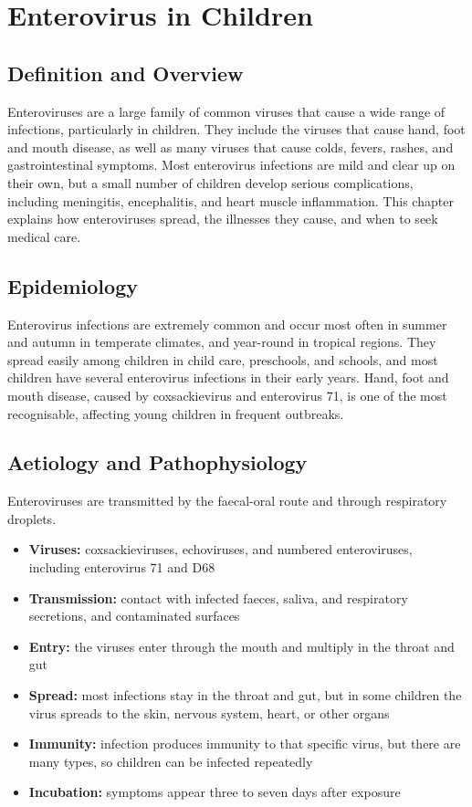 \chapter{Enterovirus in Children}

\section*{Definition and Overview}
Enteroviruses are a large family of common viruses that cause a wide range of infections, particularly in children. They include the viruses that cause hand, foot and mouth disease, as well as many viruses that cause colds, fevers, rashes, and gastrointestinal symptoms. Most enterovirus infections are mild and clear up on their own, but a small number of children develop serious complications, including meningitis, encephalitis, and heart muscle inflammation. This chapter explains how enteroviruses spread, the illnesses they cause, and when to seek medical care.

\section*{Epidemiology}
Enterovirus infections are extremely common and occur most often in summer and autumn in temperate climates, and year-round in tropical regions. They spread easily among children in child care, preschools, and schools, and most children have several enterovirus infections in their early years. Hand, foot and mouth disease, caused by coxsackievirus and enterovirus 71, is one of the most recognisable, affecting young children in frequent outbreaks.

\section*{Aetiology and Pathophysiology}
Enteroviruses are transmitted by the faecal-oral route and through respiratory droplets.
\begin{itemize}
    \item \textbf{Viruses:} coxsackieviruses, echoviruses, and numbered enteroviruses, including enterovirus 71 and D68
    \item \textbf{Transmission:} contact with infected faeces, saliva, and respiratory secretions, and contaminated surfaces
    \item \textbf{Entry:} the viruses enter through the mouth and multiply in the throat and gut
    \item \textbf{Spread:} most infections stay in the throat and gut, but in some children the virus spreads to the skin, nervous system, heart, or other organs
    \item \textbf{Immunity:} infection produces immunity to that specific virus, but there are many types, so children can be infected repeatedly
    \item \textbf{Incubation:} symptoms appear three to seven days after exposure
\end{itemize}

